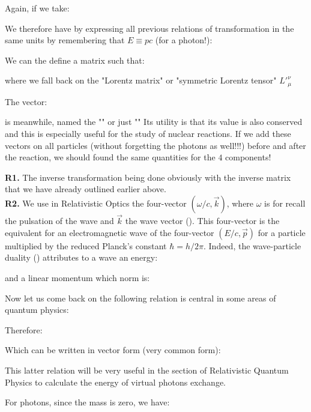 	Again, if we take:
	

	We therefore have by expressing all previous relations of transformation in the same units by remembering that $E\equiv pc$ (for a photon!):
	
	We can the define a matrix such that:
	
	where we fall back on the "Lorentz matrix" or "symmetric Lorentz tensor" ${L'}_\mu^\nu$

	The vector:
	
	is meanwhile, named the "\label{four momentum}" or just "" Its utility is that its value is also conserved and this is especially useful for the study of nuclear reactions. If we add these vectors on all particles (without forgetting the photons as well!!!) before and after the reaction, we should found the same quantities for the $4$ components!
	\begin{tcolorbox}[title=Remarks,colframe=black,arc=10pt]
	\textbf{R1.} The inverse transformation being done obviously with the inverse matrix that we have already outlined earlier above.\\
	
	\textbf{R2.} We use in Relativistic Optics the four-vector $(\omega/c,\vec{k})$, where $\omega$ is for recall the pulsation of the wave and $\vec{k}$ the wave vector (). This four-vector is the equivalent for an electromagnetic wave of the four-vector $(E/c,\vec{p})$ for a particle multiplied by the reduced Planck's constant $\hbar=h/2\pi$. Indeed, the wave-particle duality () attributes to a wave an energy\label{wave number special relativity}:
	
	and a linear momentum which norm is:
	
	\end{tcolorbox}
	Now let us come back on the following relation is central in some areas of quantum physics:
	
	Therefore:
	
	Which can be written in vector form (very common form):
	
	This latter relation will be very useful in the section of Relativistic Quantum Physics to calculate the energy of virtual photons exchange.

	For photons, since the mass is zero, we have:
	
